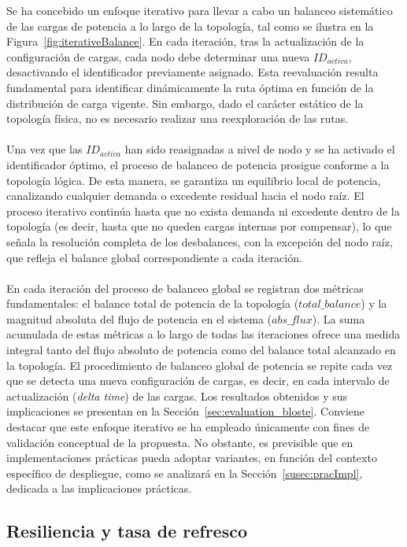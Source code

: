Se ha concebido un enfoque iterativo para llevar a cabo un balanceo sistemático de las cargas de potencia a lo largo de la topología, tal como se ilustra en la Figura~\ref{fig:iterativeBalance}. En cada iteración, tras la actualización de la configuración de cargas, cada nodo debe determinar una nueva $ID_{activa}$, desactivando el identificador previamente asignado. Esta reevaluación resulta fundamental para identificar dinámicamente la ruta óptima en función de la distribución de carga vigente. Sin embargo, dado el carácter estático de la topología física, no es necesario realizar una reexploración de las rutas. \\
\\
Una vez que las $ID_{activa}$ han sido reasignadas a nivel de nodo y se ha activado el identificador óptimo, el proceso de balanceo de potencia prosigue conforme a la topología lógica. De esta manera, se garantiza un equilibrio local de potencia, canalizando cualquier demanda o excedente residual hacia el nodo raíz. El proceso iterativo continúa hasta que no exista demanda ni excedente dentro de la topología (es decir, hasta que no queden cargas internas por compensar), lo que señala la resolución completa de los desbalances, con la excepción del nodo raíz, que refleja el balance global correspondiente a cada iteración.\\
\\
En cada iteración del proceso de balanceo global se registran dos métricas fundamentales: el balance total de potencia de la topología ($total\_balance$) y la magnitud absoluta del flujo de potencia en el sistema ($abs\_flux$). La suma acumulada de estas métricas a lo largo de todas las iteraciones ofrece una medida integral tanto del flujo absoluto de potencia como del balance total alcanzado en la topología. El procedimiento de balanceo global de potencia se repite cada vez que se detecta una nueva configuración de cargas, es decir, en cada intervalo de actualización (\emph{delta time}) de las cargas. Los resultados obtenidos y sus implicaciones se presentan en la Sección~\ref{sec:evaluation_bloste}. Conviene destacar que este enfoque iterativo se ha empleado únicamente con fines de validación conceptual de la propuesta. No obstante, es previsible que en implementaciones prácticas pueda adoptar variantes, en función del contexto específico de despliegue, como se analizará en la Sección~\ref{susec:pracImpl}, dedicada a las implicaciones prácticas.


\subsection{Resiliencia y tasa de refresco}

